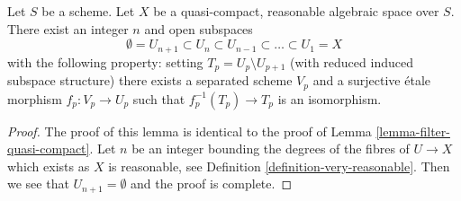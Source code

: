 \begin{lemma}
\label{lemma-filter-reasonable}
Let $S$ be a scheme. Let $X$ be a quasi-compact, reasonable algebraic space
over $S$. There exist an integer $n$ and open subspaces
$$
\emptyset = U_{n + 1} \subset
U_n \subset U_{n - 1} \subset \ldots \subset U_1 = X
$$
with the following property: setting $T_p = U_p \setminus U_{p + 1}$
(with reduced induced subspace structure) there exists a separated scheme
$V_p$ and a surjective \'etale morphism $f_p : V_p \to U_p$ such that
$f_p^{-1}(T_p) \to T_p$ is an isomorphism.
\end{lemma}

\begin{proof}
The proof of this lemma is identical to the proof of
Lemma \ref{lemma-filter-quasi-compact}.
Let $n$ be an integer bounding the degrees of
the fibres of $U \to X$ which exists as $X$ is reasonable, see
Definition \ref{definition-very-reasonable}.
Then we see that $U_{n + 1} = \emptyset$ and the proof is complete.
\end{proof}
